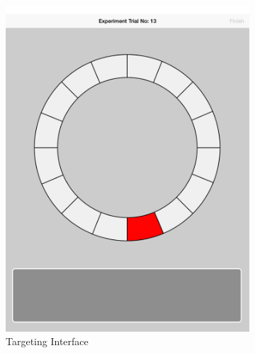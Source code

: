 \begin{figure}[H]
\centering
\begin{subfigure}[b]{0.3\textwidth}
	\centering
	\includegraphics[width=\textwidth]{figures/NFD.png}
	\caption{Targeting Interface}
	\label{fig:NFD}
\end{subfigure}
\hfill
\begin{subfigure}[b]{0.3\textwidth}
	\centering

\end{subfigure}
\end{figure}
